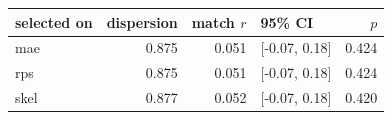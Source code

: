 
\begin{tabular}{lrrlr}
\toprule
selected on & dispersion & match $r$ & 95\% CI & $p$\\
\midrule
mae & 0.875 & 0.051 & {}[-0.07, 0.18] & 0.424\\
rps & 0.875 & 0.051 & {}[-0.07, 0.18] & 0.424\\
skel & 0.877 & 0.052 & {}[-0.07, 0.18] & 0.420\\
\bottomrule
\end{tabular}
